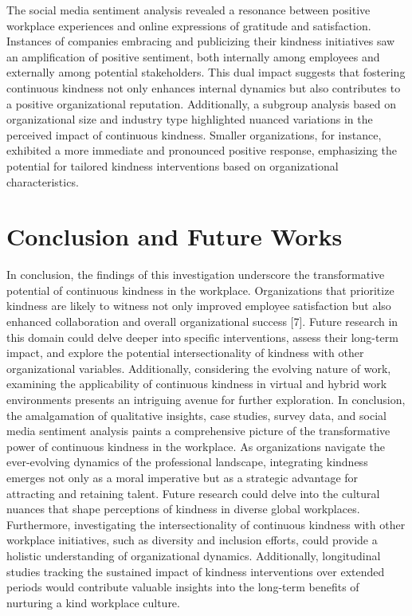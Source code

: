 \documentclass[a4paper, 11pt]{report}
\begin{document}
The social media sentiment analysis revealed a resonance between positive workplace experiences and online expressions of gratitude and satisfaction. Instances of companies embracing and publicizing their kindness initiatives saw an amplification of positive sentiment, both internally among employees and externally among potential stakeholders. This dual impact suggests that fostering continuous kindness not only enhances internal dynamics but also contributes to a positive organizational reputation.
\vspace{5mm} %
\newline
Additionally, a subgroup analysis based on organizational size and industry type highlighted nuanced variations in the perceived impact of continuous kindness. Smaller organizations, for instance, exhibited a more immediate and pronounced positive response, emphasizing the potential for tailored kindness interventions based on organizational characteristics.

\section{Conclusion and Future Works}
In conclusion, the findings of this investigation underscore the transformative potential of continuous kindness in the workplace. Organizations that prioritize kindness are likely to witness not only improved employee satisfaction but also enhanced collaboration and overall organizational success [7]. Future research in this domain could delve deeper into specific interventions, assess their long-term impact, and explore the potential intersectionality of kindness with other organizational variables. Additionally, considering the evolving nature of work, examining the applicability of continuous kindness in virtual and hybrid work environments presents an intriguing avenue for further exploration.
\vspace{5mm} %
\newline
In conclusion, the amalgamation of qualitative insights, case studies, survey data, and social media sentiment analysis paints a comprehensive picture of the transformative power of continuous kindness in the workplace. As organizations navigate the ever-evolving dynamics of the professional landscape, integrating kindness emerges not only as a moral imperative but as a strategic advantage for attracting and retaining talent.
\vspace{5mm} %
\newline
Future research could delve into the cultural nuances that shape perceptions of kindness in diverse global workplaces. Furthermore, investigating the intersectionality of continuous kindness with other workplace initiatives, such as diversity and inclusion efforts, could provide a holistic understanding of organizational dynamics. Additionally, longitudinal studies tracking the sustained impact of kindness interventions over extended periods would contribute valuable insights into the long-term benefits of nurturing a kind workplace culture.
\end{document}

